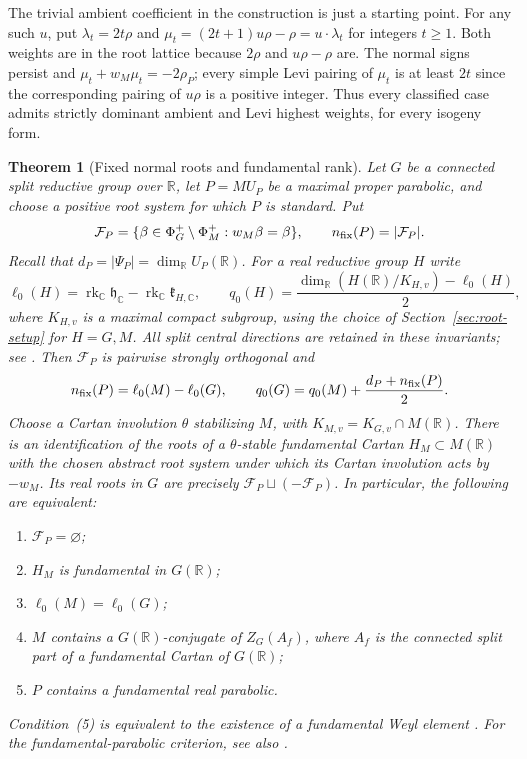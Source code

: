 \documentclass[12pt]{amsart}
\numberwithin{equation}{section}
\theoremstyle{plain}
\newtheorem{theorem}{Theorem}[section]
\theoremstyle{definition}
\theoremstyle{remark}
\newcommand{\R}{\mathbb R}
\begin{document}
The trivial ambient coefficient in the construction is just a starting point. For any such $u$, put $\lambda_t=2t\rho$ and $\mu_t=(2t+1)u\rho-\rho=u\cdot\lambda_t$ for integers $t\ge1$. Both weights are in the root lattice because $2\rho$ and $u\rho-\rho$ are. The normal signs persist and $\mu_t+w_M\mu_t=-2\rho_P$; every simple Levi pairing of $\mu_t$ is at least $2t$ since the corresponding pairing of $u\rho$ is a positive integer. Thus every classified case admits strictly dominant ambient and Levi highest weights, for every isogeny form. 

\begin{theorem}[Fixed normal roots and fundamental rank] \label{thm:fixed-roots-fundamental-rank}
Let $G$ be a connected split reductive group over $\mathbb R$, let $P=MU_P$ be a maximal proper parabolic, and choose a positive root system for which $P$ is standard. Put 
\[
 \mathcal F_P=\{\beta\in\Phi_G^+\setminus\Phi_M^+:w_M\beta=\beta\},
 \qquad n_{\rm fix}(P)=|\mathcal F_P|.
\]
Recall that $d_P=|\Psi_P|=\dim_{\mathbb R}U_P(\R)$. For a real reductive group $H$ write 
\[
 \ell_0(H)=\operatorname{rk}_{\mathbb C}\mathfrak h_{\mathbb C}
       -\operatorname{rk}_{\mathbb C}\mathfrak k_{H,\mathbb C},
 \qquad
 q_0(H)=\frac{\dim_{\mathbb R}(H(\mathbb R)/K_{H,v})-\ell_0(H)}2,
\]
where $K_{H,v}$ is a maximal compact subgroup, using the choice of Section~\ref{sec:root-setup} for $H=G,M$. All split central directions are retained in these invariants; see \cite[Ch.~III, \S\S4.1, 4.3]{BorelWallach}. Then $\mathcal F_P$ is pairwise strongly orthogonal and \begin{equation}\label{eq:fixed-root-rank-degree}
 n_{\rm fix}(P)=\ell_0(M)-\ell_0(G),\qquad
 q_0(G)=q_0(M)+\frac{d_P+n_{\rm fix}(P)}{2}.
\end{equation}
Choose a Cartan involution $\theta$ stabilizing $M$, with $K_{M,v}=K_{G,v}\cap M(\mathbb R)$. There is an identification of the roots of a $\theta$-stable fundamental Cartan $H_M\subset M(\mathbb R)$ with the chosen abstract root system under which its Cartan involution acts by $-w_M$. Its real roots in $G$ are precisely $\mathcal F_P\sqcup(-\mathcal F_P)$. In particular, the following are equivalent:
\begin{enumerate}
\item $\mathcal F_P=\varnothing$;
\item $H_M$ is fundamental in $G(\mathbb R)$;
\item $\ell_0(M)=\ell_0(G)$;
\item $M$ contains a $G(\R)$-conjugate of $Z_G(A_f)$, where $A_f$
is the connected split part of a fundamental Cartan of $G(\R)$;
\item $P$ contains a fundamental real parabolic.
\end{enumerate}
Condition~(5) is equivalent to the existence of a fundamental Weyl element \cite[Lemma~8.7(i)--(ii)]{SaperMicro}. For the fundamental-parabolic criterion, see also \cite[\S1.8]{BorelCasselman1983}.
\end{theorem}
\end{document}
